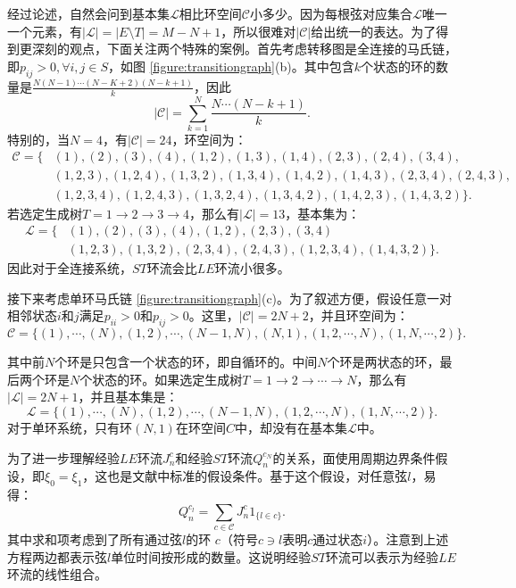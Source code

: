 经过论述，自然会问到基本集$\mathcal{L}$相比环空间$\mathcal{C}$小多少。因为每根弦对应集合$\mathcal{L}$唯一一个元素，有$|\mathcal{L}| = |E\setminus T| = M-N+1$，所以很难对$|\mathcal{C}|$给出统一的表达。为了得到更深刻的观点，下面关注两个特殊的案例。首先考虑转移图是全连接的马氏链，即$p_{ij}>0, \forall i,j \in S$，如图 \ref{figure:transitiongraph}(b)。其中包含$k$个状态的环的数量是$\frac{N (N-1) \cdots (N-K+2)(N-k+1)}{k}$，因此
\begin{equation*}
    |\mathcal{C}| = \sum_{k=1}^N\frac{N\cdots (N-k+1)}{k}.
\end{equation*}
特别的，当$N=4$，有$|\mathcal{C}|=24$，环空间为：
\begin{align*}
    \mathcal{C} = \{&(1),(2),(3),(4),(1,2),(1,3),(1,4),(2,3),(2,4),(3,4),\\
    &(1,2,3),(1,2,4),(1,3,2),(1,3,4),(1,4,2),(1,4,3),(2,3,4),(2,4,3),\\
    &(1,2,3,4),(1,2,4,3),(1,3,2,4),(1,3,4,2),(1,4,2,3),(1,4,3,2)\}.
\end{align*}
若选定生成树$T = 1\to 2\to 3\to 4$，那么有$|\mathcal{L}|=13$，基本集为：
\begin{align*}
    \mathcal{L} = \{&(1),(2),(3),(4),(1,2),(2,3),(3,4)\\
    &(1,2,3),(1,3,2),(2,3,4),(2,4,3),(1,2,3,4),(1,4,3,2)\}.
\end{align*}
因此对于全连接系统，$ST$环流会比$LE$环流小很多。

接下来考虑单环马氏链 \ref{figure:transitiongraph}(c)。为了叙述方便，假设任意一对相邻状态$i$和$j$满足$p_{ii}>0$和$p_{ij}>0$。这里，$|\mathcal{C}| = 2N +2$，并且环空间为：
\begin{equation}\label{cycle_space}
    \mathcal{C} = \{(1),\cdots,(N),(1,2),\cdots,(N-1,N),(N,1),(1,2,\cdots,N),(1,N,\cdots,2)\}.
\end{equation}

其中前$N$个环是只包含一个状态的环，即自循环的。中间$N$个环是两状态的环，最后两个环是$N$个状态的环。如果选定生成树$T = 1\to 2\to\cdots \to N$，那么有$|\mathcal{L}| = 2N + 1$，并且基本集是：
\begin{equation*}
    \mathcal{L} = \{(1),\cdots,(N),(1,2),\cdots,(N-1,N),(1,2,\cdots,N),(1,N,\cdots,2)\}.
\end{equation*}
对于单环系统，只有环$(N, 1)$在环空间$C$中，却没有在基本集$\mathcal{L}$中。

为了进一步理解经验$LE$环流$J_n^c$和经验$ST$环流$Q_n^{c_N}$的关系，面使用周期边界条件假设，即$\xi_0 = \xi_1$，这也是文献\cite{den2000large}中标准的假设条件。基于这个假设，对任意弦$l$，易得：
\begin{equation}\label{conversion}
    Q_n^{c_l} = \sum_{c\in\mathcal{C}}J^c_n1_{\{l\in c\}}.
\end{equation}
其中求和项考虑到了所有通过弦$l$的环 $c$（符号$c \ni l$表明$c$通过状态$i$）。注意到上述方程两边都表示弦$l$单位时间按形成的数量。这说明经验$ST$环流可以表示为经验$LE$环流的线性组合。
